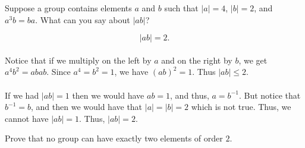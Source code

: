 \documentclass[12 pt, letterpaper]{hmcpset}
\begin{document}
\pagebreak

\begin{problem}[3.]
	Suppose a group contains elements $a$ and $b$ such that $\vert a \vert = 4$, $\vert b \vert = 2$, and $a^{3}b = ba$. What can you say about $\vert ab \vert$?
\end{problem}

\begin{solution}
	\[
		\boxed{
			\vert ab \vert = 2.
		}
	\] \\
	Notice that if we multiply on the left by $a$ and on the right by $b$, we get $a^{4} b^{2} = ab ab$. Since $a^{4} = b^{2} = 1$, we have $(ab)^{2} = 1$. Thus $\vert ab \vert \le 2$. \\\\
	If we had $\vert ab \vert = 1$ then we would have $ab = 1$, and thus, $a = b^{-1}$. But notice that $b^{-1} = b$, and then we would have that $\vert a \vert = \vert b \vert = 2$ which is not true. Thus, we cannot have $\vert ab \vert = 1$. Thus, $\vert ab \vert = 2$.
\end{solution}

\pagebreak

\begin{problem}[4.]
	Prove that no group can have exactly two elements of order $2$.
\end{problem}
\end{document}
